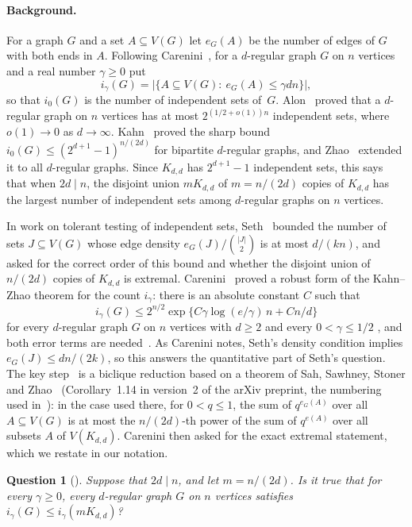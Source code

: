 \documentclass[11pt]{article}
\newtheorem*{question}{Question}
\theoremstyle{remark}
\begin{document}
\paragraph{Background.}
For a graph $G$ and a set $A\subseteq V(G)$ let $e_G(A)$ be the number of
edges of $G$ with both ends in $A$. Following Carenini~\cite{car}, for a
$d$-regular graph $G$ on $n$ vertices and a real number $\gamma\ge0$ put
\[
 i_\gamma(G)=\bigl|\{A\subseteq V(G):\ e_G(A)\le\gamma dn\}\bigr|,
\]
so that $i_0(G)$ is the number of independent sets of~$G$. Alon~\cite{alon}
proved that a $d$-regular graph on $n$ vertices has at most
$2^{(1/2+o(1))n}$ independent sets, where $o(1)\to0$ as $d\to\infty$.
Kahn~\cite{kahn} proved the sharp bound $i_0(G)\le(2^{d+1}-1)^{n/(2d)}$ for
bipartite $d$-regular graphs, and Zhao~\cite{zhao} extended it to all
$d$-regular graphs. Since $K_{d,d}$ has $2^{d+1}-1$ independent sets, this
says that when $2d\mid n$, the disjoint union $mK_{d,d}$ of $m=n/(2d)$ copies
of $K_{d,d}$ has the largest number of independent sets among $d$-regular
graphs on $n$ vertices.

In work on tolerant testing of independent sets, Seth~\cite{seth} bounded the
number of sets $J\subseteq V(G)$ whose edge density $e_G(J)/\binom{|J|}2$ is
at most $d/(kn)$, and asked for the correct order of this bound and whether
the disjoint union of $n/(2d)$ copies of $K_{d,d}$ is extremal.
Carenini~\cite{car} proved a robust form of the Kahn--Zhao theorem for the
count $i_\gamma$: there is an absolute constant $C$ such that
\[
 i_\gamma(G)\le2^{n/2}\exp\bigl\{C\gamma\log(e/\gamma)\,n+Cn/d\bigr\}
\]
for every $d$-regular graph $G$ on $n$ vertices with $d\ge2$ and every
$0<\gamma\le1/2$ \cite[Theorem~1.1]{car}, and both error terms are
needed~\cite[Proposition~1.2]{car}. As Carenini notes, Seth's density
condition implies $e_G(J)\le dn/(2k)$, so this answers the quantitative part
of Seth's question. The key step~\cite[Proposition~2.1]{car} is a biclique
reduction based on a theorem of Sah, Sawhney, Stoner and
Zhao~\cite[Corollary~1.15]{sssz} (Corollary~1.14 in version~2 of the arXiv
preprint, the numbering used in~\cite{car}): in the case used there, for
$0<q\le1$, the sum of
$q^{e_G(A)}$ over
all $A\subseteq V(G)$ is at most the $n/(2d)$-th power of the sum of
$q^{e(A)}$ over all subsets $A$ of $V(K_{d,d})$. Carenini then asked for the
exact extremal statement, which we restate in our notation.

\begin{question}[{\cite[Question~1.3]{car}}]
Suppose that $2d\mid n$, and let $m=n/(2d)$. Is it true that for every
$\gamma\ge0$, every $d$-regular graph $G$ on $n$ vertices satisfies
$i_\gamma(G)\le i_\gamma(mK_{d,d})$?
\end{question}
\end{document}
